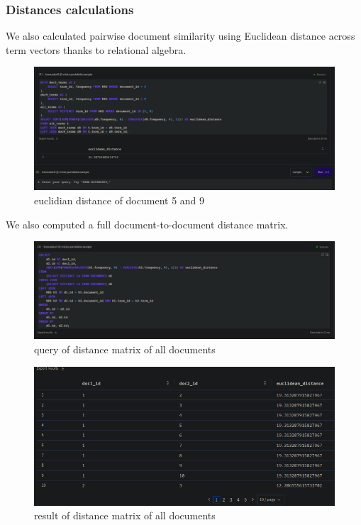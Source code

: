 \documentclass[twoside]{article}
\begin{document}
\subsubsection{Distances calculations}
We also calculated pairwise document similarity using Euclidean distance across term vectors thanks to relational algebra.

\begin{figure}[H]
  \centering
  \includegraphics[width=1\textwidth]{imgs/euclidian.png}
  \caption{euclidian distance of document 5 and 9}
  \label{fig:4}
\end{figure}

We also computed a full document-to-document distance matrix.

\begin{figure}[H]
  \centering
  \includegraphics[width=1\textwidth]{imgs/distancematrixq.png}
  \caption{query of distance matrix of all documents}
  \label{fig:5}
\end{figure}

\begin{figure}[H]
  \centering
  \includegraphics[width=1\textwidth]{imgs/distancematrixr.png}
  \caption{result of distance matrix of all documents}
  \label{fig:6}
\end{figure}
\end{document}
